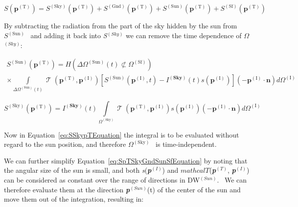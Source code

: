 \begin{equation}
S({{\mathbf{p}}^{{\mathrm{(T)}}}}) = {S^{{\mathrm{(Sky)}}}}({{\mathbf{p}}^{{\mathrm{(T)}}}}) + {S^{{\mathrm{(Gnd)}}}}({{\mathbf{p}}^{{\mathrm{(T)}}}}) + {S^{{\mathrm{(Sun)}}}}({{\mathbf{p}}^{{\mathrm{(T)}}}}) + {S^{{\mathrm{(Sf)}}}}({{\mathbf{p}}^{{\mathrm{(T)}}}})
\label{eq:SpTSkyGndSunSfEquation}
\end{equation}

By subtracting the radiation from the part of the sky hidden by the sun from \({S^{{\mathrm{(Sun)}}}}\) ~and adding it back into \emph{S}\(^{(Sky)}\) we can remove the time dependence of \(\Omega\)\(^{(Sky)}\):

\begin{equation}
\begin{array}{c}{S^{{\mathrm{(Sun)}}}}({{\mathbf{p}}^{{\mathrm{(T)}}}}) = H\left( {\Delta {\Omega ^{{\mathrm{(Sun)}}}}(t) \not\subset {\Omega ^{{\mathrm{(Sf)}}}}} \right)\\ \times \int\limits_{\Delta {\Omega ^{{\mathrm{(Sun)}}}}(t)} {\operatorname{\mathcal{T}} ({{\mathbf{p}}^{{\mathrm{(T)}}}},{{\mathbf{p}}^{{\mathrm{(I)}}}})\left[ {{S^{{\mathrm{(Sun)}}}}({{\mathbf{p}}^{{\mathrm{(I)}}}},t) - {I^{({\mathbf{Sky}})}}(t)s({{\mathbf{p}}^{{\mathrm{(I)}}}})} \right]\left( { - {{\mathbf{p}}^{{\mathrm{(I)}}}}\cdot {\mathbf{n}}} \right)d{\Omega ^{{\mathrm{(I)}}}}} \end{array}
\label{eq:SSunpTEquation}
\end{equation}

\begin{equation}
{S^{{\mathrm{(Sky)}}}}({{\mathbf{p}}^{{\mathrm{(T)}}}}) = {I^{({\mathbf{Sky}})}}(t)\int\limits_{{\Omega ^{{\mathrm{(Sky)}}}}} {\operatorname{\mathcal{T}} ({{\mathbf{p}}^{{\mathrm{(T)}}}},{{\mathbf{p}}^{{\mathrm{(I)}}}})s({{\mathbf{p}}^{{\mathrm{(I)}}}})\left( { - {{\mathbf{p}}^{{\mathrm{(I)}}}}\cdot {\mathbf{n}}} \right)d{\Omega ^{{\mathrm{(I)}}}}}
\label{eq:SSkypTEquation}
\end{equation}

Now in Equation~\ref{eq:SSkypTEquation} the integral is to be evaluated without regard to the sun position, and therefore \({\Omega ^{{\mathrm{(Sky)}}}}\) ~is time-independent.

We can further simplify Equation~\ref{eq:SpTSkyGndSunSfEquation} by noting that the angular size of the sun is small, and both \emph{s}(\textbf{\emph{p}}\(^{(I)}\)) and \(
mathcal{T}\)(\textbf{\emph{p}}\(^{(T)}\), \textbf{\emph{p}}\(^{(I)}\)) can be considered as constant over the range of directions in DW\(^{(Sun)}\).~ We can therefore evaluate them at the direction \textbf{\emph{p}}\(^{(Sun)}\)(t) of the center of the sun and move them out of the integration, resulting in:

